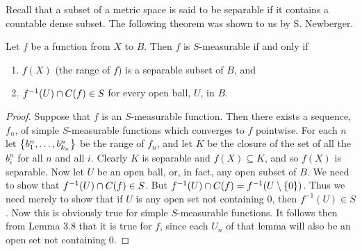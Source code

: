 Recall that a subset of a metric space is said to be separable if it contains a countable dense subset. The following theorem was shown to us by S. Newberger.

\begin{theorem}
Let $f$ be a function from $X$ to $B$. Then $f$ is $S$-measurable if and only if
\begin{enumerate}[label=\arabic*).]
    \item $f(X)$ (the range of $f$) is a separable subset of $B$, and
    \item $f^{-1}(U) \cap C(f) \in S$ for every open ball, $U$, in $B$.
\end{enumerate}
\end{theorem}

\begin{proof}
Suppose that $f$ is an $S$-measurable function. Then there exists a sequence, $f_n$, of simple $S$-measurable functions which converges to $f$ pointwise. For each $n$ let $\left\{b_1^n, \dots, b_{k_n}^n\right\}$ be the range of $f_n$, and let $K$ be the closure of the set of all the $b_i^n$ for all $n$ and all $i$. Clearly $K$ is separable and $f(X) \subseteq K$, and so $f(X)$ is separable. Now let $U$ be an open ball, or, in fact, any open subset of $B$. We need to show that $f^{-1}(U)\cap C(f)\in S$. But $f^{-1}(U) \cap C(f)=f^{-1}(U\setminus\left\{0\right\})$. Thus we need merely to show that if $U$ is any open set not containing 0, then $f^{-1}(U) \in S$. Now this is obviously true for simple $S$-measurable functions. It follows then from Lemma 3.8 that it is true for $f$, since each $U_n$ of that lemma will also be an open set not containing 0.


\end{proof}
